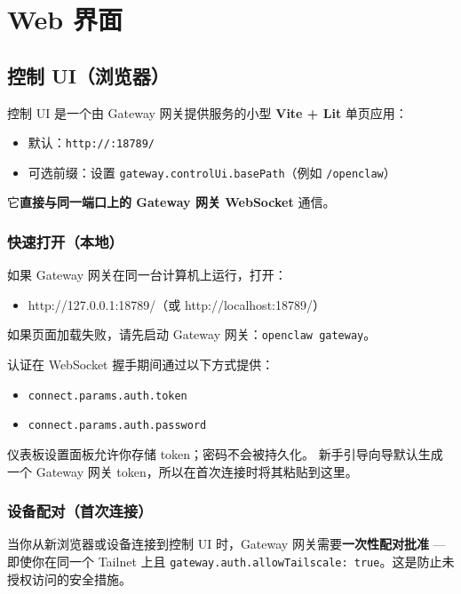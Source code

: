 \chapter{Web 界面}

\section{控制 UI（浏览器）}


控制 UI 是一个由 Gateway 网关提供服务的小型 \textbf{Vite + Lit} 单页应用：

\begin{itemize}
  \item 默认：\texttt{http://:18789/}
  \item 可选前缀：设置 \texttt{gateway.controlUi.basePath}（例如 \texttt{/openclaw}）
\end{itemize}


它\textbf{直接与同一端口上的 Gateway 网关 WebSocket} 通信。

\subsection{快速打开（本地）}


如果 Gateway 网关在同一台计算机上运行，打开：

\begin{itemize}
  \item http://127.0.0.1:18789/（或 http://localhost:18789/）
\end{itemize}


如果页面加载失败，请先启动 Gateway 网关：\texttt{openclaw gateway}。

认证在 WebSocket 握手期间通过以下方式提供：

\begin{itemize}
  \item \texttt{connect.params.auth.token}
  \item \texttt{connect.params.auth.password}
\end{itemize}

仪表板设置面板允许你存储 token；密码不会被持久化。
新手引导向导默认生成一个 Gateway 网关 token，所以在首次连接时将其粘贴到这里。

\subsection{设备配对（首次连接）}


当你从新浏览器或设备连接到控制 UI 时，Gateway 网关需要\textbf{一次性配对批准} — 即使你在同一个 Tailnet 上且 \texttt{gateway.auth.allowTailscale: true}。这是防止未授权访问的安全措施。

